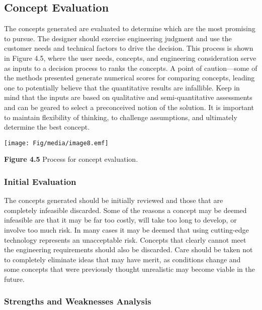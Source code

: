 \subsection{Concept Evaluation}\label{concept-evaluation}

The concepts generated are evaluated to determine which are the most
promising to pursue. The designer should exercise engineering judgment
and use the customer needs and technical factors to drive the decision.
This process is shown in Figure 4.5, where the user needs, concepts, and
engineering consideration serve as inputs to a decision process to ranks
the concepts. A point of caution---some of the methods presented
generate numerical scores for comparing concepts, leading one to
potentially believe that the quantita­tive results are infallible. Keep
in mind that the inputs are based on qualitative and semi-quantitative
assessments and can be geared to select a preconceived notion of the
solution. It is important to maintain flexibility of thinking, to
challenge assumptions, and ultimately determine the best concept.

\texttt{[image: Fig/media/image8.emf]}

\textbf{Figure 4.5} Process for concept evaluation.

\subsubsection{Initial Evaluation}\label{initial-evaluation}

The concepts generated should be initially reviewed and those that are
completely infeasible discarded. Some of the reasons a concept may be
deemed infeasible are that it may be far too costly, will take too long
to develop, or involve too much risk. In many cases it may be deemed
that using cutting-edge technology represents an unacceptable risk.
Concepts that clearly cannot meet the engineering requirements should
also be discarded. Care should be taken not to completely eliminate
ideas that may have merit, as conditions change and some concepts that
were previously thought unrealistic may become viable in the future.

\subsubsection{Strengths and Weaknesses
Analysis}\label{strengths-and-weaknesses-analysis}


